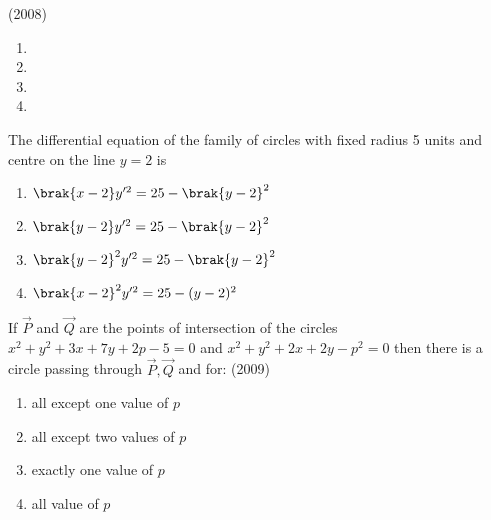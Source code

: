 \hfill{(2008)}
\begin{multicols}{2}
\begin{enumerate}
\item {}
\item {}
\item {}
\item {}
\end{enumerate}
\end{multicols}
\item The differential equation of the family of circles with fixed radius 5 units and centre on the line $y=2$ is
\begin{enumerate}
\item $\brak{x-2}y^{\prime 2}=25-\brak{y-2}^2$
\item $\brak{y-2}y^{\prime 2}=25-\brak{y-2}^2$
\item $\brak{y-2}^2y^{\prime 2}=25-\brak{y-2}^2$
\item $\brak{x-2}^2y^{\prime 2}=25-(y-2)^2$
\end{enumerate}
\item If $\vec{P}$ and $\vec{Q}$ are the points of intersection of the circles $x^2+y^2+3x+7y+2p-5=0$ and $x^2+y^2+2x+2y-p^2=0$ then there is a circle passing through $\vec{P}, \vec{Q}$ and  for:
\hfill{(2009)}
\begin{enumerate}
\item all except one value of $p$
\item all except two values of $p$
\item exactly one value of $p$
\item all value of $p$
\end{enumerate}

